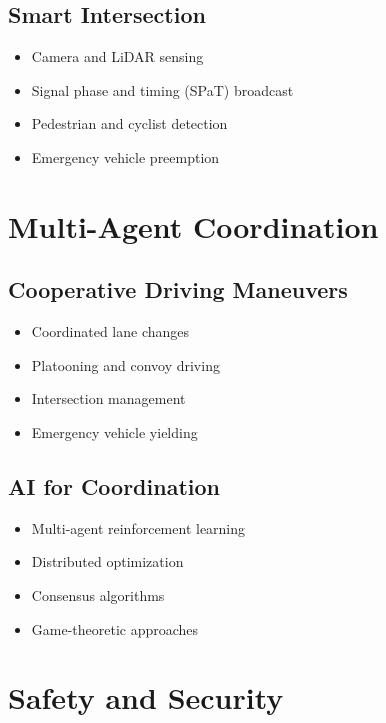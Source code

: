 \documentclass[12pt,a4paper]{article}
\begin{document}
\subsection{Smart Intersection}

\begin{itemize}
    \item Camera and LiDAR sensing
    \item Signal phase and timing (SPaT) broadcast
    \item Pedestrian and cyclist detection
    \item Emergency vehicle preemption
\end{itemize}

\section{Multi-Agent Coordination}

\subsection{Cooperative Driving Maneuvers}

\begin{itemize}
    \item Coordinated lane changes
    \item Platooning and convoy driving
    \item Intersection management
    \item Emergency vehicle yielding
\end{itemize}

\subsection{AI for Coordination}

\begin{itemize}
    \item Multi-agent reinforcement learning
    \item Distributed optimization
    \item Consensus algorithms
    \item Game-theoretic approaches
\end{itemize}

\section{Safety and Security}
\end{document}
